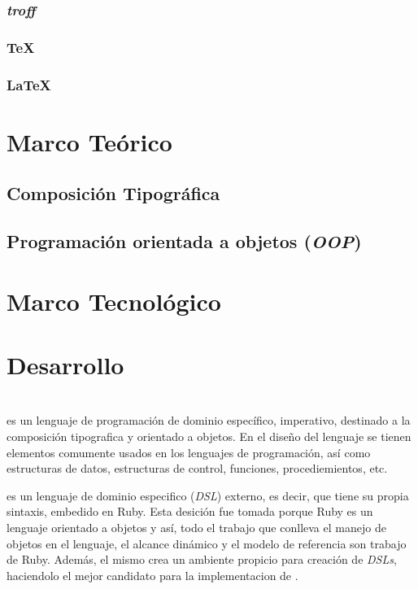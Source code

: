 \documentclass[12pt,letterpaper,titlepage,oneside,openright]{book}
\newcommand{\OhTeX}{%
    \makebox[0.76em][c]{O}%
    \makebox[0.25em][c]{%
        \raisebox{0.14em}[0em][0em]{%
            \fontsize{0.5em}{0cm}%
                \selectfont H%
        }%
    }%
    \makebox[1.35em][c]{\TeX}%
}
\newcommand{\ohtex}{\OhTeX\xspace}
\begin{document}
\subsection{\textit{troff}}
\lipsum[1-2]
\subsection{\TeX}
\lipsum[1-2]
\subsection{\LaTeX}
\lipsum[1-2]
\subsection[OhTeX]{\ohtex}
\lipsum[1-2]

\chapter{Marco Teórico}
\lipsum[1-2]
\section{Composición Tipográfica}
\section{Programación orientada a objetos (\textit{OOP})}

\chapter{Marco Tecnológico}
\lipsum[1-2]

\chapter{Desarrollo}
\lipsum[1-2]

\chapter[OhTeX]{\ohtex}

\ohtex es un lenguaje de programación de dominio específico, imperativo,
destinado a la composición tipografica y orientado a objetos. En el diseño del
lenguaje se tienen elementos comumente usados en los lenguajes de programación,
así como estructuras de datos, estructuras de control, funciones,
procediemientos, etc.

\ohtex es un lenguaje de dominio especifico (\textit{DSL}) externo, es decir,
que tiene su propia sintaxis, embedido en Ruby. Esta desición fue tomada porque
Ruby es un lenguaje orientado a objetos y así, todo el trabajo que conlleva el
manejo de objetos en el lenguaje, el alcance dinámico y el modelo de referencia
son trabajo de Ruby. Además, el mismo crea un ambiente propicio para creación de
\textit{DSLs}, haciendolo el mejor candidato para la implementacion de \ohtex.
\end{document}
